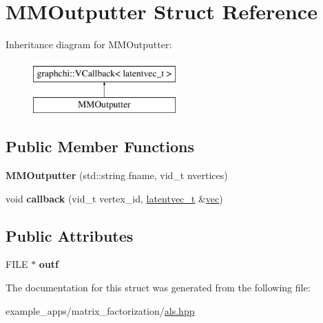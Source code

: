 \hypertarget{struct_m_m_outputter}{\section{M\-M\-Outputter Struct Reference}
\label{struct_m_m_outputter}
}
Inheritance diagram for M\-M\-Outputter\-:\begin{figure}[H]
\begin{center}
\leavevmode
\includegraphics[height=2.000000cm]{struct_m_m_outputter}
\end{center}
\end{figure}
\subsection*{Public Member Functions}
\begin{DoxyCompactItemize}
\item 
\hypertarget{struct_m_m_outputter_a98b92db2f29aea04805757a76b329846}{{\bfseries M\-M\-Outputter} (std\-::string fname, vid\-\_\-t nvertices)}\label{struct_m_m_outputter_a98b92db2f29aea04805757a76b329846}

\item 
\hypertarget{struct_m_m_outputter_a84cc87cf85763a7122ac82ece5c6f6bd}{void {\bfseries callback} (vid\-\_\-t vertex\-\_\-id, \hyperlink{structlatentvec__t}{latentvec\-\_\-t} \&\hyperlink{structvec}{vec})}\label{struct_m_m_outputter_a84cc87cf85763a7122ac82ece5c6f6bd}

\end{DoxyCompactItemize}
\subsection*{Public Attributes}
\begin{DoxyCompactItemize}
\item 
\hypertarget{struct_m_m_outputter_aec16d4c9c2694e514a779575a17e284a}{F\-I\-L\-E $\ast$ {\bfseries outf}}\label{struct_m_m_outputter_aec16d4c9c2694e514a779575a17e284a}

\end{DoxyCompactItemize}


The documentation for this struct was generated from the following file\-:\begin{DoxyCompactItemize}
\item 
example\-\_\-apps/matrix\-\_\-factorization/\hyperlink{als_8hpp}{als.\-hpp}\end{DoxyCompactItemize}
